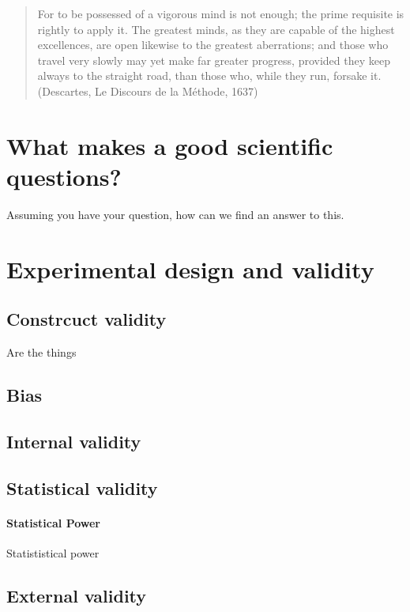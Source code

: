 \documentclass{tufte-book}
\begin{document}
\begin{quote}
For to be possessed of a vigorous mind is not enough; the prime requisite is rightly to apply it. The greatest minds, as they are capable of the highest excellences, are open likewise to the greatest aberrations; and those who travel very slowly may yet make far greater progress, provided they keep always to the straight road, than those who, while they run, forsake it. (Descartes, Le Discours de la Méthode, 1637) 
\end{quote}


\section{What makes a good scientific questions?}

Assuming you have your question, how can we find an answer to this.



\section{Experimental design and validity}

\subsection{Constrcuct validity}

Are the things 

\subsection{Bias}


\citep{Ransohoff-Biasasthreat-2005}

\subsection{Internal validity}


\subsection{Statistical validity}


\paragraph{Statistical Power} Statististical power


\subsection{External validity}
\end{document}
